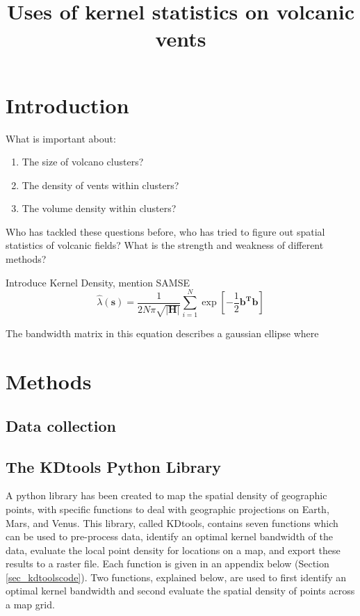 \documentclass[12pt,letter]{article}
\title{Uses of kernel statistics on volcanic vents}
\date{}
\author{}
\begin{document}
\maketitle

\section{Introduction}

What is important about:
\begin{enumerate}
\item The size of volcano clusters?
\item The density of vents within clusters?
\item The volume density within clusters?
\end{enumerate}

Who has tackled these questions before, who has tried to figure out spatial statistics
of volcanic fields? What is the strength and weakness of different methods?

Introduce Kernel Density, mention SAMSE
\begin{equation}
\hat{\lambda}(\mathbf{s})=\frac{1}{2N\pi\sqrt{|\mathbf{H}|}}\sum\limits_{i=1}^{N}\exp\left[-\frac{1}{2}\mathbf{b^Tb}\right]
\label{eq_kde}
\end{equation}

The bandwidth matrix in this equation describes a gaussian ellipse where 


\section{Methods}

\subsection{Data collection}


\subsection{The KDtools Python Library}

A python library has been created to map the spatial density of geographic points, with specific functions to deal with geographic projections on Earth, Mars, and Venus. This library, called KDtools, contains seven functions which can be used to pre-process data, identify an optimal kernel bandwidth of the data, evaluate the local point density for locations on a map, and export these results to a raster file. Each function is given in an appendix below (Section \ref{sec_kdtoolscode}). Two functions, explained below, are used to first identify an optimal kernel bandwidth and second evaluate the spatial density of points across a map grid.
\end{document}

